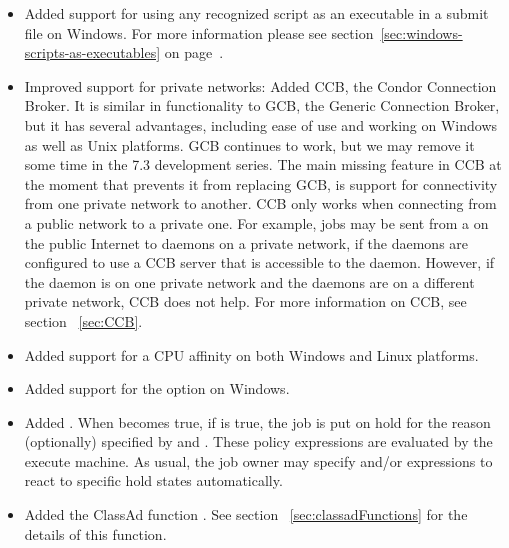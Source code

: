 \begin{itemize}

\item Added support for using any recognized script as an executable
in a submit file on Windows. For more information please see
section~\ref{sec:windows-scripts-as-executables} on
page~\pageref{sec:windows-scripts-as-executables}.

\item Improved support for private networks:
Added CCB, the Condor Connection Broker.  It is similar in
functionality to GCB, the Generic Connection Broker, but it has
several advantages, including ease of use and working on Windows as
well as Unix platforms.
GCB continues to work, but we may remove
it some time in the 7.3 development series.  The main missing feature
in CCB at the moment that prevents it from replacing GCB,
is support for connectivity from one private network to another.
CCB only works
when connecting from a public network to a private one.  For example,
jobs may be sent from a  on the public Internet to 
 daemons on a
private network, if the  daemons are configured
to use a CCB server that is accessible to the  daemon.
However, if the  daemon is on one private
network and the  daemons are on a different private network,
CCB does not help.  For more information on CCB, see section~ \ref{sec:CCB}.

\item Added support for a CPU affinity on both Windows and Linux platforms.

\item Added support for the   option on Windows.

\item Added .  When  becomes
true, if  is true, the job is put on hold for the
reason (optionally) specified by  and
.  These policy expressions are evaluated
by the execute machine.  As usual, the job owner may specify
 and/or 
expressions to react to specific hold states automatically.

\item Added the ClassAd function .
See section~ \ref{sec:classadFunctions} for the details of this function.



\end{itemize}
